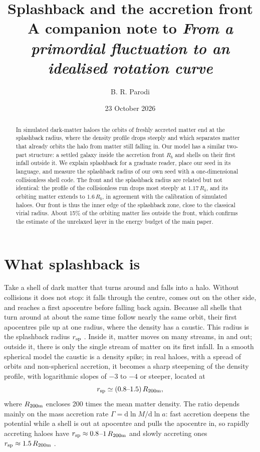 \documentclass[11pt,a4paper]{article}
\title{Splashback and the accretion front\\[4pt]
\large A companion note to \emph{From a primordial fluctuation to an idealised rotation curve}}
\author{B. R. Parodi}
\date{23 October 2026}
\newcommand{\dd}{\mathrm{d}}
\newcommand{\Rb}{R_b}
\newcommand{\rsp}{r_{\rm sp}}
\begin{document}
\maketitle

\begin{abstract}
In simulated dark-matter haloes the orbits of freshly accreted matter
end at the splashback radius, where the density profile drops steeply
and which separates matter that already orbits the halo from matter
still falling in. Our model has a similar two-part structure: a settled
galaxy inside the accretion front $\Rb$ and shells on their first infall
outside it. We explain splashback for a graduate reader, place our seed
in its language, and measure the splashback radius of our own seed with
a one-dimensional collisionless shell code. The front and the splashback
radius are related but not identical: the profile of the collisionless
run drops most steeply at $1.17\,\Rb$, and its orbiting matter extends
to $1.6\,\Rb$, in agreement with the calibration of simulated haloes. Our
front is thus the inner edge of the splashback zone, close to the
classical virial radius. About 15\% of the orbiting matter lies outside
the front, which confirms the estimate of the unrelaxed layer in the
energy budget of the main paper.
\end{abstract}

\section{What splashback is}

Take a shell of dark matter that turns around and falls into a halo.
Without collisions it does not stop: it falls through the centre, comes
out on the other side, and reaches a first apocentre before falling back
again. Because all shells that turn around at about the same time follow
nearly the same orbit, their first apocentres pile up at one radius,
where the density has a caustic. This radius is the splashback radius
$\rsp$ \citep{Diemer2014,Adhikari2014,More2015}. Inside it, matter moves
on many streams, in and out; outside it, there is only the single stream
of matter on its first infall. In a smooth spherical model the caustic
is a density spike; in real haloes, with a spread of orbits and
non-spherical accretion, it becomes a sharp steepening of the density
profile, with logarithmic slopes of $-3$ to $-4$ or steeper, located at
\begin{equation}
  \rsp\simeq(0.8\text{--}1.5)\,R_{\rm 200m},
\end{equation}
where $R_{\rm 200m}$ encloses 200 times the mean matter density. The
ratio depends mainly on the mass accretion rate
$\Gamma=\dd\ln M/\dd\ln a$: fast accretion deepens the potential while a
shell is out at apocentre and pulls the apocentre in, so rapidly
accreting haloes have $\rsp\approx0.8$--$1\,R_{\rm 200m}$ and slowly
accreting ones $\rsp\approx1.5\,R_{\rm 200m}$ \citep{More2015}.
\end{document}
